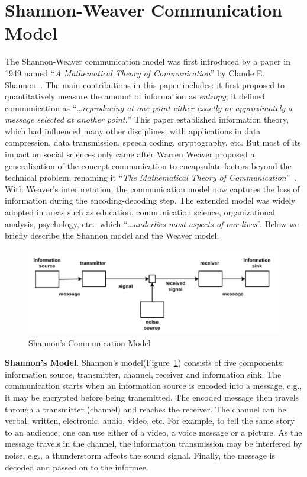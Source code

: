 \section{Shannon-Weaver Communication Model}
\label{ch1:sec3:overview}

The Shannon-Weaver communication model was first introduced by a paper in 1949 named ``\textit{A Mathematical Theory of Communication}'' by Claude E. Shannon~\cite{shannon1948mathematical}. The main contributions in this paper includes: it first proposed to quantitatively measure the amount of information as \textit{entropy}; it defined communication as ``\textit{\ldots reproducing at one point either exactly or approximately a message selected at another point.}'' This paper established information theory, which had influenced many other disciplines, with applications in data compression, data transmission, speech coding, cryptography, etc. But most of its impact on social sciences only came after Warren Weaver proposed a generalization of the concept communication to encapsulate factors beyond the technical problem, renaming it ``\textit{The Mathematical Theory of Communication}''~\cite{shannon1951mathematical}. With Weaver's interpretation, the communication model now captures the loss of information during the encoding-decoding step. The extended model was widely adopted in areas such as education, communication science, organizational analysis, psychology, etc., which ``\textit{\ldots underlies most aspects of our lives}''. Below we briefly describe the Shannon model and the Weaver model. 

\begin{figure}[h]
\centering
\includegraphics[width=.7\linewidth]{figure/chapter1/shannon}
\caption{Shannon's Communication Model~\cite{shannon1948mathematical}\label{fig:ch1:shannon}}
\end{figure}

\textbf{Shannon's Model}. Shannon's model(Figure~\ref{fig:ch1:shannon}) consists of five components: information source, transmitter, channel, receiver and information sink. The communication starts when an information source is encoded into a message, e.g., it may be encrypted before being transmitted. The encoded message then travels through a transmitter (channel) and reaches the receiver. The channel can be verbal, written, electronic, audio, video, etc. For example, to tell the same story to an audience, one can use either of a video, a voice message or a picture. As the message travels in the channel, the information transmission may be interfered by noise, e.g., a thunderstorm affects the sound signal. Finally, the message is decoded and passed on to the informee. 

